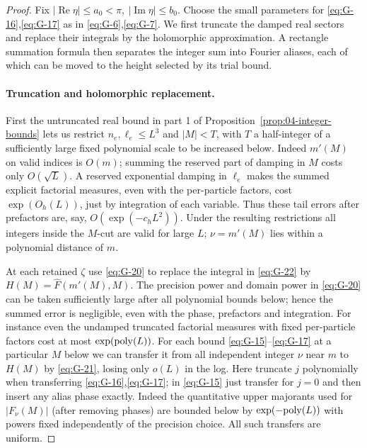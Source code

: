 \begin{proof}
Fix \(|\operatorname{Re}\eta|\le a_0<\pi,\ |\operatorname{Im}\eta|\le b_0\). Choose the small parameters for \eqref{eq:G-16},\eqref{eq:G-17} as in \eqref{eq:G-6},\eqref{eq:G-7}.
We first truncate the damped real sectors and replace their integrals by
the holomorphic approximation. A rectangle summation formula then
separates the integer sum into Fourier aliases, each of which can be
moved to the height selected by its trial bound.

\paragraph{Truncation and holomorphic replacement.}

First the untruncated real bound in part 1 of
Proposition~\ref{prop:04-integer-bounds} lets us restrict \(n_e,\ell_e\le L^3\) and \(|M|<T\), with \(T\) a half-integer of a sufficiently large fixed polynomial scale to be increased below. Indeed \(m'(M)\) on valid indices is \(O(m)\); summing the reserved part of damping in \(M\) costs only \(O(\sqrt L)\). A reserved exponential damping in \(\ell_e\) makes the summed explicit factorial measures, even with the per-particle factors, cost \(\exp(O_h(L))\), just by integration of each variable. Thus these tail errors after prefactors are, say, \(O(\exp(-c_h L^2))\). Under the resulting restrictions all integers inside the \(M\)-cut are valid for large \(L\); \(\nu=m'(M)\) lies within a polynomial distance of \(m\).

At each retained \(\zeta\) use \eqref{eq:G-20} to replace the integral in \eqref{eq:G-22} by \(H(M)=\widehat F(m'(M),M)\). The precision power and domain power in \eqref{eq:G-20} can be taken sufficiently large after all polynomial bounds below; hence the summed error is negligible, even with the phase, prefactors and integration. For instance even the undamped truncated factorial measures with fixed per-particle factors cost at most \(\exp({\rm poly}(L))\). For each bound \eqref{eq:G-15}–\eqref{eq:G-17} at a particular \(M\) below we can transfer it from all independent integer \(\nu\) near \(m\) to \(H(M)\) by \eqref{eq:G-21}, losing only \(o(L)\) in the log. Here truncate \(j\) polynomially when transferring \eqref{eq:G-16},\eqref{eq:G-17}; in \eqref{eq:G-15} just transfer for \(j=0\) and then insert any alias phase exactly. Indeed the quantitative upper majorants used for \(|F_\nu(M)|\) (after removing phases) are bounded below by \(\exp(-{\rm poly}(L))\) with powers fixed independently of the precision choice. All such transfers are uniform.


\end{proof}
